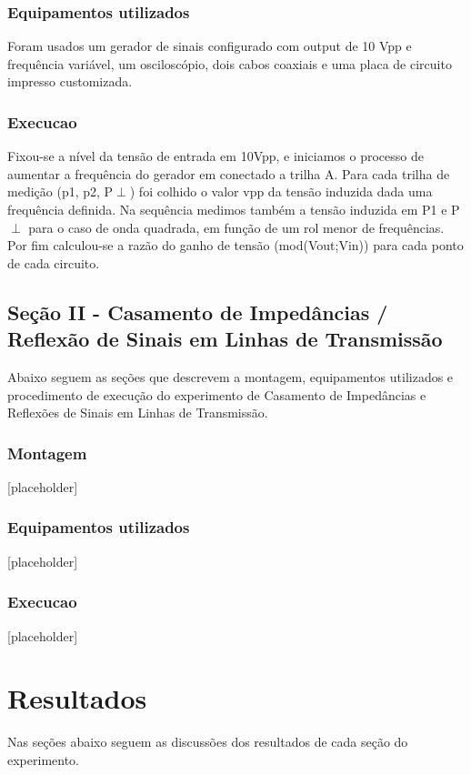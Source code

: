 \documentclass[12pt]{article}
\begin{document}
\subsubsection{Equipamentos utilizados}
Foram usados um gerador de sinais configurado com output de 10 Vpp e
frequência variável, um osciloscópio, dois cabos coaxiais e uma placa
de circuito impresso customizada.

\subsubsection{Execucao}
Fixou-se a nível da tensão de entrada em 10Vpp, e iniciamos o
processo de aumentar a frequência do gerador em conectado a trilha A.
Para cada trilha de medição (p1, p2, P$\perp$) foi colhido o valor
vpp da tensão induzida dada uma frequência definida.
Na sequência medimos também a tensão induzida em P1 e P$\perp$ para o
caso de onda quadrada, em função de um rol menor de frequências.
Por fim calculou-se a razão do ganho de tensão (mod(Vout;Vin)) para
cada ponto de cada circuito.

\subsection{Seção II - Casamento de Impedâncias / Reflexão de Sinais
em Linhas de Transmissão}

Abaixo seguem as seções que descrevem a montagem, equipamentos
utilizados e procedimento de execução do experimento de Casamento de
Impedâncias e Reflexões de Sinais em Linhas de Transmissão.

\subsubsection{Montagem}
[placeholder]

\subsubsection{Equipamentos utilizados}
[placeholder]

\subsubsection{Execucao}
[placeholder]

\section{Resultados}
Nas seções abaixo seguem as discussões dos resultados de cada seção
do experimento.
\end{document}
